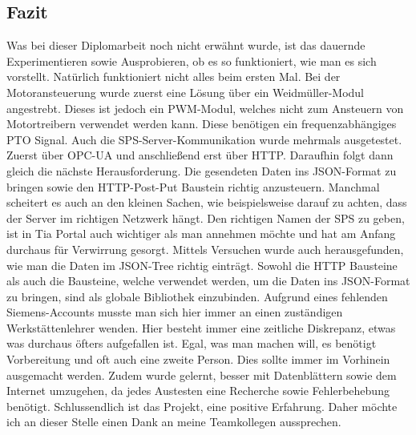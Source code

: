 \subsection{Fazit}
Was bei dieser Diplomarbeit noch nicht erwähnt wurde, ist das dauernde Experimentieren sowie Ausprobieren, ob es so funktioniert, wie man es sich vorstellt. Natürlich funktioniert nicht alles beim ersten Mal. Bei der Motoransteuerung wurde zuerst eine Lösung über ein Weidmüller-Modul angestrebt. Dieses ist jedoch ein PWM-Modul, welches nicht zum Ansteuern von Motortreibern verwendet werden kann. Diese benötigen ein frequenzabhängiges PTO Signal. Auch die SPS-Server-Kommunikation wurde mehrmals ausgetestet. Zuerst über OPC-UA und anschließend erst über HTTP. Daraufhin folgt dann gleich die nächste Herausforderung. Die gesendeten Daten ins JSON-Format zu bringen sowie den HTTP-Post-Put Baustein richtig anzusteuern. Manchmal scheitert es auch an den kleinen Sachen, wie beispielsweise darauf zu achten, dass der Server im richtigen Netzwerk hängt. Den richtigen Namen der SPS zu geben, ist in Tia Portal auch wichtiger als man annehmen möchte und hat am Anfang durchaus für Verwirrung gesorgt. Mittels Versuchen wurde auch herausgefunden, wie man die Daten im JSON-Tree richtig einträgt. Sowohl die HTTP Bausteine als auch die Bausteine, welche verwendet werden, um die Daten ins JSON-Format zu bringen, sind als globale Bibliothek einzubinden. Aufgrund eines fehlenden Siemens-Accounts musste man sich hier immer an einen zuständigen Werkstättenlehrer wenden. Hier besteht immer eine zeitliche Diskrepanz, etwas was durchaus öfters aufgefallen ist. Egal, was man machen will, es benötigt Vorbereitung und oft auch eine zweite Person. Dies sollte immer im Vorhinein ausgemacht werden. Zudem wurde gelernt, besser mit Datenblättern sowie dem Internet umzugehen, da jedes Austesten eine Recherche sowie Fehlerbehebung benötigt. Schlussendlich ist das Projekt, eine positive Erfahrung. Daher möchte ich an dieser Stelle einen Dank an meine Teamkollegen aussprechen.

